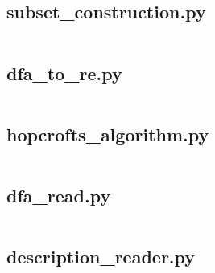 \documentclass{article}
\begin{document}
\subsection{subset\_construction.py}
\label{code:subset}
\inputminted{python}{./subset_construction.py}

\subsection{dfa\_to\_re.py}
\label{code:dfaToRe}
\inputminted{python}{./dfa_to_re.py}

\subsection{hopcrofts\_algorithm.py}
\label{code:hopcrofts}
\inputminted{python}{./hopcrofts_algorithm.py}

\subsection{dfa\_read.py}
\label{code:dfaRead}
\inputminted{python}{./dfa_read.py}

\subsection{description\_reader.py}
\label{code:descriptionReader}
\inputminted{python}{./description_reader.py}
\end{document}
